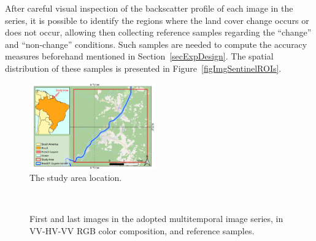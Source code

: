 \documentclass[journal]{IEEEtran}
\begin{document}
After careful visual inspection of the backscatter profile of each image in the series, it is possible to identify the regions where the land cover change occurs or does not occur, allowing then collecting reference samples regarding the ``change'' and ``non-change'' conditions. 
Such samples are needed to compute the accuracy measures beforehand mentioned in Section~\ref{secExpDesign}. The spatial distribution of these samples is presented in Figure~\ref{figImgSentinelROIs}.


\begin{figure}[hbt]
\centering
\includegraphics[width=0.485\textwidth]{../../qgis/maps/StudyArea_OSM.pdf}
\caption{The study area location.}\label{figAE}
\end{figure}


\begin{figure}[hbt]
\centering

\mbox{
}


\caption{First and last images in the adopted multitemporal image series, in VV-HV-VV RGB color composition, and reference samples.}\label{figImageRef}
\end{figure}
\end{document}
